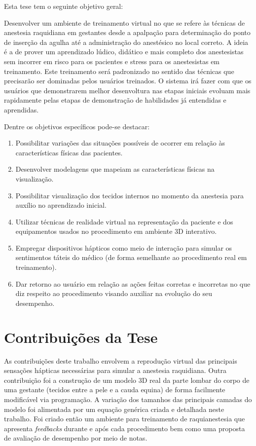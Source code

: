Esta tese tem o seguinte objetivo geral:

Desenvolver um ambiente de treinamento virtual no que se refere às técnicas de anestesia raquidiana em gestantes desde a apalpação para determinação do ponto de inserção da agulha até a administração do anestésico no local correto. A ideia é a de prover um aprendizado lúdico, didático e mais completo dos anestesistas sem incorrer em risco para os pacientes e stress para os anestesistas em treinamento. Este treinamento será padronizado no sentido das técnicas que precisarão ser dominadas pelos usuários treinados. O sistema irá fazer com que os usuários que demonstrarem melhor desenvoltura nas etapas iniciais evoluam mais rapidamente pelas etapas de demonstração de habilidades já entendidas e aprendidas. 

Dentre os objetivos específicos pode-se destacar:
\begin{enumerate}
\item Possibilitar variações das situações possíveis de ocorrer em relação às características físicas das pacientes. 
\item Desenvolver modelagens que mapeiam as características físicas na visualização. 
\item Possibilitar visualização dos tecidos internos no momento da anestesia para auxílio no aprendizado inicial. 
\item Utilizar técnicas de realidade virtual na representação da paciente e dos equipamentos usados no procedimento em ambiente 3D interativo.
\item Empregar dispositivos hápticos como meio de interação para simular os sentimentos táteis do médico (de forma semelhante ao procedimento real em treinamento). 
\item Dar retorno ao usuário em relação as ações feitas corretas e incorretas no que diz respeito ao procedimento visando auxiliar na evolução do seu desempenho.
\end{enumerate}

\section{Contribuições da Tese}
\label{sec:contribuicoes}

As contribuições deste trabalho envolvem a reprodução virtual das principais sensações hápticas necessárias para simular a anestesia raquidiana. Outra contribuição foi a construção de um modelo 3D real da parte lombar do corpo de uma gestante (tecidos entre a pele e a cauda equina) de forma facilmente modificável via programação. A variação dos tamanhos das principais camadas do modelo foi alimentada por um equação genérica criada e detalhada neste trabalho. Foi criado então um ambiente para treinamento de raquianestesia que apresenta \textit{feedbacks} durante e após cada
procedimento bem como uma proposta de avaliação de desempenho por meio de notas.

